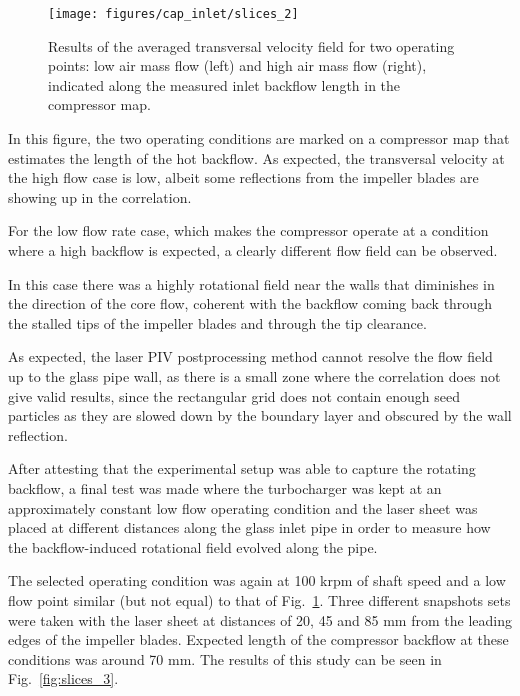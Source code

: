\begin{figure}[thb!]
\hspace{-0.06\textwidth}
\texttt{[image: figures/cap\_inlet/slices\_2]}
\caption[Transversal velocity fields measured by PIV (flow rate)]{Results of the averaged transversal velocity field for two operating points: low air mass flow (left) and high air mass flow (right), indicated along the measured inlet backflow length in the compressor map.}
\label{fig:slices_2}
\end{figure}

In this figure, the two operating conditions are marked on a compressor map that estimates the length of the hot backflow. As expected, the transversal velocity at the high flow case is low, albeit some reflections from the impeller blades are showing up in the correlation.

For the low flow rate case, which makes the compressor operate at a condition where a high backflow is expected, a clearly different flow field can be observed.

In this case there was a highly rotational field near the walls that diminishes in the direction of the core flow, coherent with the backflow coming back through the stalled tips of the impeller blades and through the tip clearance.

As expected, the laser PIV postprocessing method cannot resolve the flow field up to the glass pipe wall, as there is a small zone where the correlation does not give valid results, since the rectangular grid does not contain enough seed particles as they are slowed down by the boundary layer and obscured by the wall reflection.

After attesting that the experimental setup was able to capture the rotating backflow, a final test was made where the turbocharger was kept at an approximately constant low flow operating condition and the laser sheet was placed at different distances along the glass inlet pipe in order to measure how the backflow-induced rotational field evolved along the pipe.

The selected operating condition was again at 100 krpm of shaft speed and a low flow point similar (but not equal) to that of Fig.~\ref{fig:slices_2}. Three different snapshots sets were taken with the laser sheet at distances of 20, 45 and 85 mm from the leading edges of the impeller blades. Expected length of the compressor backflow at these conditions was around 70 mm. The results of this study can be seen in Fig.~\ref{fig:slices_3}.

